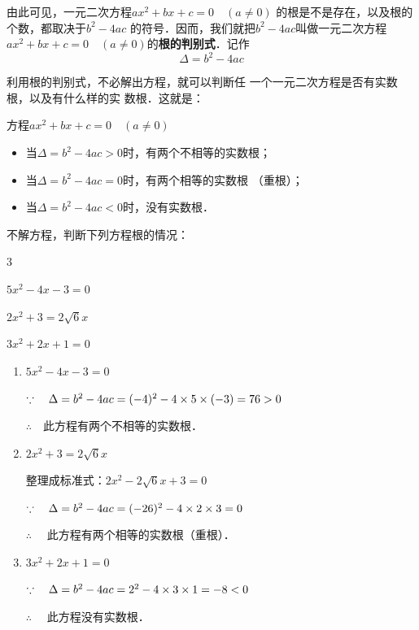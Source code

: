 由此可见，一元二次方程$ax^2+bx+c=0\quad (a\ne 0)$
的根是不是存在，以及根的个数，都取决于$b^2-4ac$
的符号．因而，我们就把$b^2-4ac$叫做一元二次方程
$ax^2+bx+c=0\quad (a\ne 0)$的\textbf{根的判别式}．记作
\[\Delta =b^2-4ac\]

利用根的判别式，不必解出方程，就可以判断任
一个一元二次方程是否有实数根，以及有什么样的实
数根．这就是：
\begin{blk}{}
    方程$ax^2+bx+c=0\quad (a\ne 0)$
    \begin{itemize}
        \item 当$\Delta =b^2-4ac>0$时，有两个不相等的实数根；
        \item 当$\Delta=b^2-4ac=0$时，有两个相等的实数根
        （重根）；
        \item 当$\Delta=b^2-4ac<0$时，没有实数根．
    \end{itemize}
\end{blk}

\begin{example}
    不解方程，判断下列方程根的情况：
    \begin{enumerate}
        \begin{multicols}{3}
             \item $5x^2-4x-3=0$
        \item $2x^2+3=2\sqrt{6}x$
        \item $3x^2+2x+1=0$
        \end{multicols}
    \end{enumerate}
\end{example}

\begin{solution}
\begin{enumerate}
    \item $5x^2-4x-3=0$
    
    $\because\quad \Delta =b^2-4ac=(-4)^2-4\times5 \times(-3)=76>0$

   $\therefore\quad $此方程有两个不相等的实数根．
   \item $2x^2+3=2\sqrt{6}x$
   
    整理成标准式：$2x^2-2\sqrt{6}x+3=0$

    $\because\quad \Delta=b^2-4ac=(-26)^2-4\times2\times3=0$

 $\therefore\quad $   此方程有两个相等的实数根（重根）．

\item $3x^2+2x+1=0$
    
$\because\quad \Delta=b^2-4ac=2^2-4\times3\times1=-8<0$

$\therefore\quad $   此方程没有实数根．
\end{enumerate}
\end{solution}

